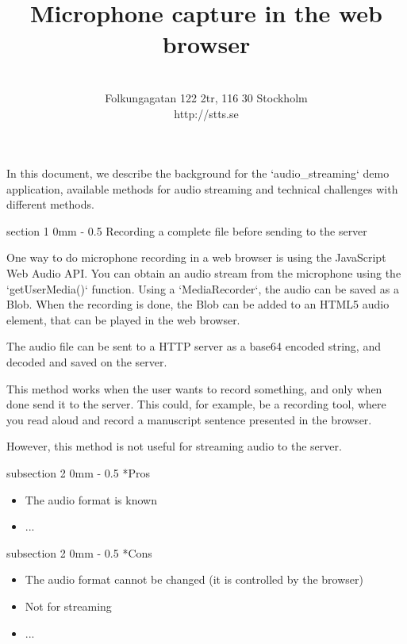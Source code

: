 \documentclass[11pt, a4paper, twoside]{article}
\title{ Microphone capture in the web browser }
\author{ \stts \\
  Folkungagatan 122 2tr, 116 30 Stockholm\\
  http://stts.se }
\makeatletter
\renewcommand{\subsection}{\@startsection
   {subsection}%
   {2}%
   {0mm}%
   {-\baselineskip}%
   {0.5\baselineskip}%
   {\bfseries\sffamily\large}}%
\renewcommand{\section}{\@startsection
   {section}%
   {1}%
   {0mm}%
   {-\baselineskip}%
   {0.5\baselineskip}%
   {\bfseries\sffamily\Large}}%
\makeatother
\begin{document}
  
  \maketitle
 \cfoot{\thepage (\pageref{LastPage})}  
  

In this document, we describe the background for the
`audio\_streaming` demo application, available methods for audio
streaming and technical challenges with different methods.


\section{Recording a complete file before sending to the server}

One way to do microphone recording in a web browser is using the
JavaScript Web Audio API. You can obtain an audio stream from the
microphone using the `getUserMedia()` function. Using a
`MediaRecorder`, the audio can be saved as a Blob. When the recording
is done, the Blob can be added to an HTML5 audio element, that can be
played in the web browser.

The audio file can be sent to a HTTP server as a base64 encoded
string, and decoded and saved on the server.

This method works when the user wants to record something, and only
when done send it to the server. This could, for example, be a
recording tool, where you read aloud and record a manuscript sentence
presented in the browser.

However, this method is not useful for streaming audio to the server.

\subsection*{Pros}
\begin{itemize}
\item The audio format is known
\item ...
  \end{itemize}

\subsection*{Cons}
\begin{itemize}
\item The audio format cannot be changed (it is controlled by the browser)
\item Not for streaming
\item ...
\end{itemize}
\end{document}

